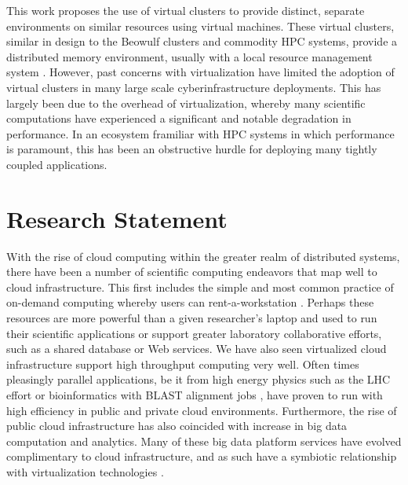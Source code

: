 This work proposes the use of virtual clusters \cite{Foster2006} to provide distinct, separate environments on similar resources using virtual machines. These virtual clusters, similar in design to the Beowulf clusters and commodity HPC systems, provide a distributed memory environment, usually with a local resource management system \cite{czajkowski1998resource}.  However, past concerns with virtualization have limited the adoption of virtual clusters in many large scale cyberinfrastructure deployments. This has largely been due to the overhead of virtualization, whereby many scientific computations have experienced a significant and notable degradation in performance.  In an ecosystem framiliar with HPC systems in which performance is paramount, this has been an obstructive hurdle for deploying many tightly coupled applications. 


\section{Research Statement}
\label{sec:stmt}


With the rise of cloud computing within the greater realm of distributed systems, there have been a number of scientific computing endeavors that map well to cloud infrastructure. This first includes the simple and most common practice of on-demand computing whereby users can rent-a-workstation \cite{kondo2009cost}. Perhaps these resources are more powerful than a given researcher's laptop and used to run their scientific applications or support greater laboratory collaborative efforts, such as a shared database or Web services.  We have also seen virtualized cloud infrastructure support high throughput computing very well. Often times pleasingly parallel applications, be it from high energy physics such as the LHC effort \cite{buncic2010cernvm, bell2015scaling} or bioinformatics with BLAST alignment jobs \cite{menon2012cloud}, have proven to run with high efficiency in public and private cloud environments. Furthermore, the rise of public cloud infrastructure has also coincided with increase in big data computation and analytics.  Many of these big data platform services have evolved complimentary to cloud infrastructure, and as such have a symbiotic relationship with virtualization technologies \cite{gunarathne2010mapreduce}.  

